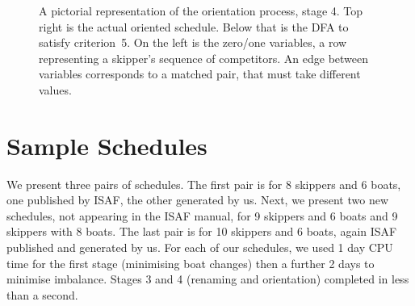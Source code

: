 \documentclass{llncs}
\begin{document}
\begin{figure}[tb]
    \caption{A pictorial representation of the orientation process, stage 4. Top right is the actual
        oriented schedule. Below that is the DFA to satisfy criterion~5. On the left is the zero/one
        variables, a row representing a skipper's sequence of competitors. An edge between variables
        corresponds to a matched pair, that must take different values.}\label{oriented}
\end{figure}

\section{Sample Schedules}\label{sec:samples}

We present three pairs of schedules. The first pair is for 8 skippers and 6 boats, one published by
ISAF, the other generated by us. Next, we present two new schedules, not appearing in the ISAF
manual, for 9 skippers and 6 boats and 9 skippers with 8 boats. The last pair is for 10 skippers and
6 boats, again ISAF published and generated by us. For each of our schedules, we used 1 day CPU time
for the first stage (minimising boat changes) then a further 2 days to minimise imbalance. Stages 3
and 4 (renaming and orientation) completed in less than a second.
\end{document}
